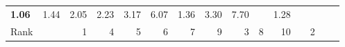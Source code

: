 \begin{tabular}{ll|rrrrrr|rrrrrrr}

  
  \textbf{1.06} & 1.44 & 2.05 & 2.23 & 3.17 & 6.07 & 1.36 & 3.30 & 7.70 &  & 1.28 \\

  Rank & &
  1 & 4 & 5 & 6 & 7 & 9 & 3 & 8 & 10 &  & 2 \\\hline\hline
  

\end{tabular}
